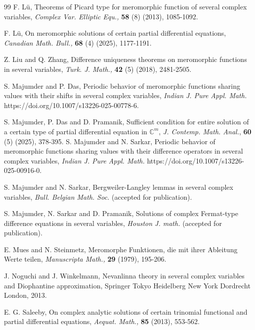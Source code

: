 \documentclass[11pt, reqno]{amsart}
\numberwithin{equation}{section}
\begin{document}
\begin{thebibliography}{99}
 {\sc F. L\"{u}}, Theorems of Picard type for meromorphic function of several complex variables, \textit{Complex Var. Elliptic Equ.,} \textbf{58} (8) (2013), 1085-1092.

 {\sc F. L\"{u}}, On meromorphic solutions of certain partial differential equations, \textit{Canadian Math. Bull.,} \textbf{68} (4) (2025), 1177-1191.

 {\sc Z. Liu} and {\sc Q. Zhang}, Difference uniqueness theorems on meromorphic functions in several variables, \textit{Turk. J. Math.,} \textbf{42} (5) (2018), 2481-2505. 

 {\sc S. Majumder} and {\sc P. Das}, Periodic behavior of meromorphic functions sharing values with their shifts in several complex variables, \textit{Indian J. Pure Appl. Math.} https://doi.org/10.1007/s13226-025-00778-6.

 {\sc S. Majumder}, {\sc P. Das} and {\sc D. Pramanik}, Sufficient condition for entire solution of a certain type of partial differential equation in $\mathbb{C}^m$, \textit{J. Contemp. Math. Anal.}, \textbf{60} (5) (2025), 378-395.
 {\sc S. Majumder} and {\sc N. Sarkar}, Periodic behavior of meromorphic functions sharing values with their difference operators in several complex variables, \textit{Indian J. Pure Appl. Math.} https://doi.org/10.1007/s13226-025-00916-0.

 {\sc S. Majumder} and {\sc N. Sarkar}, Bergweiler-Langley lemmas in several complex variables, 
\textit{Bull. Belgian Math. Soc.} (accepted for publication).

 {\sc S. Majumder}, {\sc N. Sarkar} and {\sc D. Pramanik}, Solutions of complex Fermat-type difference equations in several variables, \textit{Houston J. math.} (accepted for publication).

 {\sc E. Mues} and {\sc N. Steinmetz}, Meromorphe Funktionen, die mit ihrer Ableitung Werte teilen, \textit{Manuscripta Math.,} \textbf{29} (1979), 195-206.

 {\sc J. Noguchi} and {\sc J. Winkelmann}, Nevanlinna theory in several complex variables and Diophantine approximation, Springer Tokyo Heidelberg New York Dordrecht London, 2013.

 {\sc E. G. Saleeby}, On complex analytic solutions of certain trinomial functional and partial differential equations, \textit{Aequat. Math.,} \textbf{85} (2013), 553-562.


\end{thebibliography}
\end{document}
